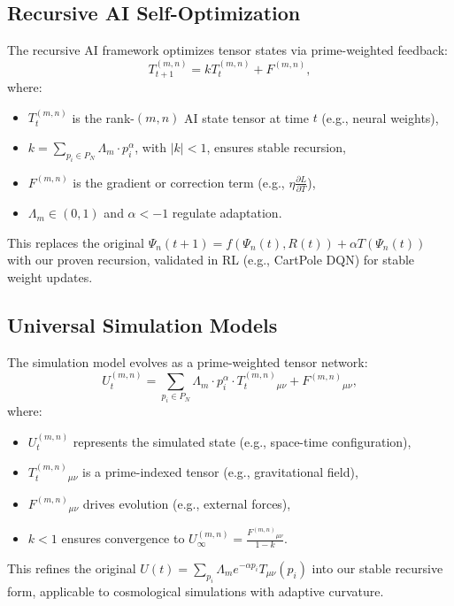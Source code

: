 \documentclass{article}
\theoremstyle{plain}
\begin{document}
\subsection{Recursive AI Self-Optimization}
The recursive AI framework optimizes tensor states via prime-weighted feedback:
\begin{equation}
    T_{t+1}^{(m,n)} = k T_t^{(m,n)} + F^{(m,n)},
\end{equation}
where:
\begin{itemize}
    \item \( T_t^{(m,n)} \) is the rank-$(m,n)$ AI state tensor at time \( t \) (e.g., neural weights),
    \item \( k = \sum_{p_i \in P_N} \Lambda_m \cdot p_i^\alpha \), with \( |k| < 1 \), ensures stable recursion,
    \item \( F^{(m,n)} \) is the gradient or correction term (e.g., \( \eta \frac{\partial L}{\partial T} \)),
    \item \( \Lambda_m \in (0, 1) \) and \( \alpha < -1 \) regulate adaptation.
\end{itemize}
This replaces the original \( \Psi_n(t+1) = f(\Psi_n(t), R(t)) + \alpha T(\Psi_n(t)) \) with our proven recursion, validated in RL (e.g., CartPole DQN) for stable weight updates.

\subsection{Universal Simulation Models}
The simulation model evolves as a prime-weighted tensor network:
\begin{equation}
    U_t^{(m,n)} = \sum_{p_i \in P_N} \Lambda_m \cdot p_i^\alpha \cdot T_t^{(m,n)}{}_{\mu\nu} + F^{(m,n)}{}_{\mu\nu},
\end{equation}
where:
\begin{itemize}
    \item \( U_t^{(m,n)} \) represents the simulated state (e.g., space-time configuration),
    \item \( T_t^{(m,n)}{}_{\mu\nu} \) is a prime-indexed tensor (e.g., gravitational field),
    \item \( F^{(m,n)}{}_{\mu\nu} \) drives evolution (e.g., external forces),
    \item \( k < 1 \) ensures convergence to \( U_\infty^{(m,n)} = \frac{F^{(m,n)}{}_{\mu\nu}}{1 - k} \).
\end{itemize}
This refines the original \( U(t) = \sum_{p_i} \Lambda_m e^{-\alpha p_i} T_{\mu\nu}(p_i) \) into our stable recursive form, applicable to cosmological simulations with adaptive curvature.
\end{document}
